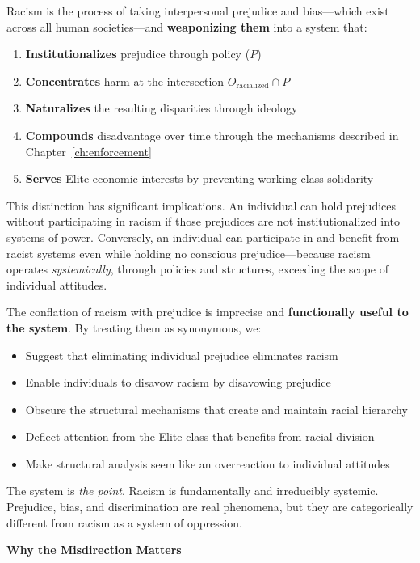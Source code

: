 Racism is the process of taking interpersonal prejudice and bias---which exist across all human societies---and \textbf{weaponizing them} into a system that:
\begin{enumerate}
    \item \textbf{Institutionalizes} prejudice through policy ($P$)
    \item \textbf{Concentrates} harm at the intersection $O_{\text{racialized}} \cap P$
    \item \textbf{Naturalizes} the resulting disparities through ideology
    \item \textbf{Compounds} disadvantage over time through the mechanisms described in Chapter~\ref{ch:enforcement}
    \item \textbf{Serves} Elite economic interests by preventing working-class solidarity
\end{enumerate}

This distinction has significant implications. An individual can hold prejudices without participating in racism if those prejudices are not institutionalized into systems of power. Conversely, an individual can participate in and benefit from racist systems even while holding no conscious prejudice---because racism operates \textit{systemically}, through policies and structures, exceeding the scope of individual attitudes.

The conflation of racism with prejudice is imprecise and \textbf{functionally useful to the system}. By treating them as synonymous, we:
\begin{itemize}
    \item Suggest that eliminating individual prejudice eliminates racism
    \item Enable individuals to disavow racism by disavowing prejudice
    \item Obscure the structural mechanisms that create and maintain racial hierarchy
    \item Deflect attention from the Elite class that benefits from racial division
    \item Make structural analysis seem like an overreaction to individual attitudes
\end{itemize}

The system is \textit{the point}. Racism is fundamentally and irreducibly systemic. Prejudice, bias, and discrimination are real phenomena, but they are categorically different from racism as a system of oppression.

\textbf{Why the Misdirection Matters}

